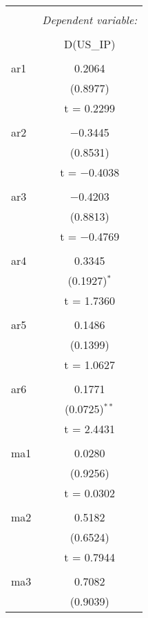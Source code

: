 
\begin{table}[!htbp] \centering 
  \caption{} 
  \label{} 
\begin{tabular}{@{\extracolsep{5pt}}lc} 
\\[-1.8ex]\hline 
\hline \\[-1.8ex] 
 & \multicolumn{1}{c}{\textit{Dependent variable:}} \\ 
\cline{2-2} 
\\[-1.8ex] & D(US_IP) \\ 
\hline \\[-1.8ex] 
 ar1 & 0.2064 \\ 
  & (0.8977) \\ 
  & t = 0.2299 \\ 
  & \\ 
 ar2 & $-$0.3445 \\ 
  & (0.8531) \\ 
  & t = $-$0.4038 \\ 
  & \\ 
 ar3 & $-$0.4203 \\ 
  & (0.8813) \\ 
  & t = $-$0.4769 \\ 
  & \\ 
 ar4 & 0.3345 \\ 
  & (0.1927)$^{*}$ \\ 
  & t = 1.7360 \\ 
  & \\ 
 ar5 & 0.1486 \\ 
  & (0.1399) \\ 
  & t = 1.0627 \\ 
  & \\ 
 ar6 & 0.1771 \\ 
  & (0.0725)$^{**}$ \\ 
  & t = 2.4431 \\ 
  & \\ 
 ma1 & 0.0280 \\ 
  & (0.9256) \\ 
  & t = 0.0302 \\ 
  & \\ 
 ma2 & 0.5182 \\ 
  & (0.6524) \\ 
  & t = 0.7944 \\ 
  & \\ 
 ma3 & 0.7082 \\ 
  & (0.9039) \\ 

\end{tabular}
\end{table}
